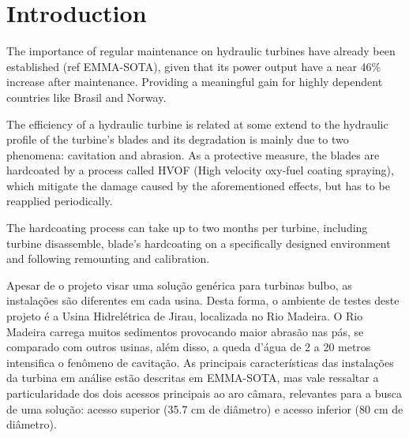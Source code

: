 \section{Introduction}


The importance of regular maintenance on hydraulic turbines have already been
established (ref EMMA-SOTA), given that its power output have a near 46\%
increase after maintenance. Providing a meaningful gain for highly dependent
countries like Brasil and Norway.


The efficiency of a hydraulic turbine is related at some extend to the hydraulic
profile of the turbine's blades and its degradation is mainly due to two
phenomena: cavitation and abrasion. As a protective measure, the blades are
hardcoated by a process called HVOF (High velocity oxy-fuel coating spraying),
which mitigate the damage caused by the aforementioned effects, but has to be
reapplied periodically.

The hardcoating process can take up to two months per turbine, including turbine
disassemble, blade's hardcoating on a specifically designed environment and
following remounting and calibration.



Apesar de o projeto visar uma solução genérica para turbinas bulbo, as
instalações são diferentes em cada usina. Desta forma, o ambiente de testes
deste projeto é a Usina Hidrelétrica de Jirau, localizada no Rio Madeira. O Rio
Madeira carrega muitos sedimentos provocando maior abrasão nas pás, se comparado
com outros usinas, além disso, a queda d'água de 2 a 20 metros intensifica o
fenômeno de cavitação. As principais características das instalações da turbina
em análise estão descritas em EMMA-SOTA, mas vale ressaltar a particularidade
dos dois acessos principais ao aro câmara, relevantes para a busca de uma
solução: acesso superior (35.7 cm de diâmetro) e acesso inferior (80 cm de
diâmetro).

